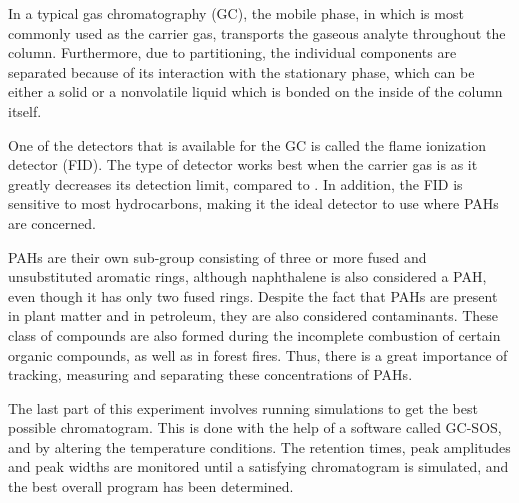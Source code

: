 \documentclass[a4paper, 12pt]{article}
\begin{document}
In a typical gas chromatography (GC), the mobile phase, in which  is most commonly used as the carrier gas, transports the gaseous analyte throughout the column. Furthermore, due to partitioning, the individual components are separated because of its interaction with the stationary phase, which can be either a solid or a nonvolatile liquid which is bonded on the inside of the column itself.

One of the detectors that is available for the GC is called the flame ionization detector (FID). The type of detector works best when the carrier gas is  as it greatly decreases its detection limit, compared to . In addition, the FID is sensitive to most hydrocarbons, making it the ideal detector to use where PAHs are concerned.

PAHs are their own sub-group consisting of three or more fused and unsubstituted aromatic rings, although naphthalene is also considered a PAH, even though it has only two fused rings. Despite the fact that PAHs are present in plant matter and in petroleum, they are also considered contaminants. These class of compounds are also formed during the incomplete combustion of certain organic compounds, as well as in forest fires. Thus, there is a great importance of tracking, measuring and separating these concentrations of PAHs.

The last part of this experiment involves running simulations to get the best possible chromatogram. This is done with the help of a software called GC-SOS\textsuperscript{\textregistered}, and by altering  the temperature conditions. The retention times, peak amplitudes and peak widths are monitored until a satisfying chromatogram is simulated, and the best overall program has been determined.
\end{document}
